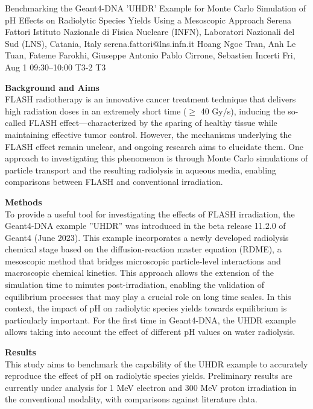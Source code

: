 \begin{talk}
  {Benchmarking the Geant4-DNA 'UHDR' Example for Monte Carlo Simulation of pH Effects on Radiolytic Species Yields Using a Mesoscopic Approach}%
  {Serena Fattori}%
  {Istituto Nazionale di Fisica Nucleare (INFN), Laboratori Nazionali del Sud (LNS), Catania, Italy}%
  {serena.fattori@lns.infn.it}%
  {Hoang Ngoc Tran, Anh Le Tuan, Fateme Farokhi, Giuseppe Antonio Pablo Cirrone, Sebastien Incerti}%
  {}%
  {Fri, Aug 1 09:30–10:00}%
  {T3-2}%
  {T3}%
  
				
			
\textbf{Background and Aims}\\
FLASH radiotherapy is an innovative cancer treatment technique that delivers high radiation doses in an extremely short time ($\geq$ 40 Gy/s), inducing the so-called FLASH effect—characterized by the sparing of healthy tissue while maintaining effective tumor control. However, the mechanisms underlying the FLASH effect remain unclear, and ongoing research aims to elucidate them. One approach to investigating this phenomenon is through Monte Carlo simulations of particle transport and the resulting radiolysis in aqueous media, enabling comparisons between FLASH and conventional irradiation.

\textbf{Methods}\\
To provide a useful tool for investigating the effects of FLASH irradiation, the Geant4-DNA example ''UHDR'' was introduced in the beta release 11.2.0 of Geant4 (June 2023). This example incorporates a newly developed radiolysis chemical stage based on the diffusion-reaction master equation (RDME), a mesoscopic method that bridges microscopic particle-level interactions and macroscopic chemical kinetics. This approach allows the extension of the simulation time to minutes post-irradiation, enabling the validation of equilibrium processes that may play a crucial role on long time scales. In this context, the impact of pH on radiolytic species yields towards equilibrium is particularly important. For the first time in Geant4-DNA, the UHDR example allows taking into account the effect of different pH values on water radiolysis.

\textbf{Results}\\
This study aims to benchmark the capability of the UHDR example to accurately reproduce the effect of pH on radiolytic species yields. Preliminary results are currently under analysis for 1 MeV electron and 300 MeV proton irradiation in the conventional modality, with comparisons against literature data.


\end{talk}
